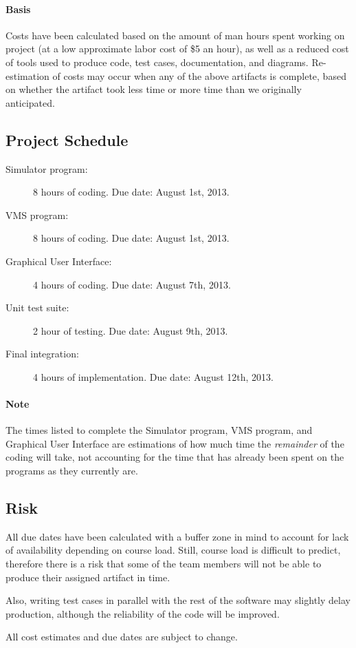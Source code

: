\documentclass{article}
\begin{document}
\paragraph{Basis} Costs have been calculated based on the amount of man hours spent working on project (at a low approximate labor cost of \$5 an hour), as well as a reduced cost of tools used to produce code, test cases, documentation, and diagrams.
Re-estimation of costs may occur when any of the above artifacts is complete, based on whether the artifact took less time or more time than we originally anticipated.

\subsection{Project Schedule}

\begin{description}
  \item[Simulator program:] 8 hours of coding. Due date: August 1st, 2013.
  \item[VMS program:] 8 hours of coding. Due date: August 1st, 2013.
  \item[Graphical User Interface:] 4 hours of coding. Due date: August 7th, 2013.
  \item[Unit test suite:] 2 hour of testing. Due date: August 9th, 2013.
  \item[Final integration:] 4 hours of implementation. Due date: August 12th, 2013.
\end{description}

\paragraph{Note}
The times listed to complete the Simulator program, VMS program, and Graphical User Interface are estimations of how much time the \emph{remainder} of the coding will take, not accounting for the time that has already been spent on the programs as they currently are.

\subsection{Risk}

	All due dates have been calculated with a buffer zone in mind to account for lack of availability depending on course load. Still, course load is difficult to predict, therefore there is a risk that some of the team members will not be able to produce their assigned artifact in time.

Also, writing test cases in parallel with the rest of the software may slightly delay production, although the reliability of the code will be improved.

All cost estimates and due dates are subject to change.

\listoffigures
\end{document}
